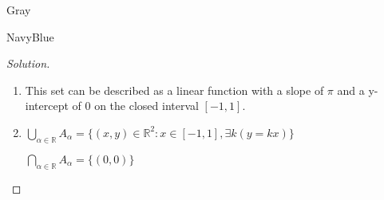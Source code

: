\documentclass[12pt]{amsart}
\theoremstyle{named}
\newenvironment{soln}
{\begin{color}{Gray}\begin{framed}\begin{color}{NavyBlue}\begin{proof}[Solution]
\doublespacing}
{\end{proof}\end{color}\end{framed}\end{color}}
\theoremstyle{definition}
\newcommand{\R}{\mathbb R}
\begin{document}
\begin{soln}
	\phantom{ }
	\begin{enumerate}
		\item This set can be described as a linear function with a slope of $\pi$ and a y-intercept of $0$
		on the closed interval $[-1,1]$.

		\item $\displaystyle\bigcup_{\alpha\in\R} A_\alpha = \{(x,y) \in \mathbb R^2 : x \in  [-1,1], \exists k (y = kx)\}$
		
		
		\noindent $\displaystyle\bigcap_{\alpha\in\R} A_\alpha = \{(0,0)\}$

		
	\end{enumerate}
	
\end{soln}
\end{document}
